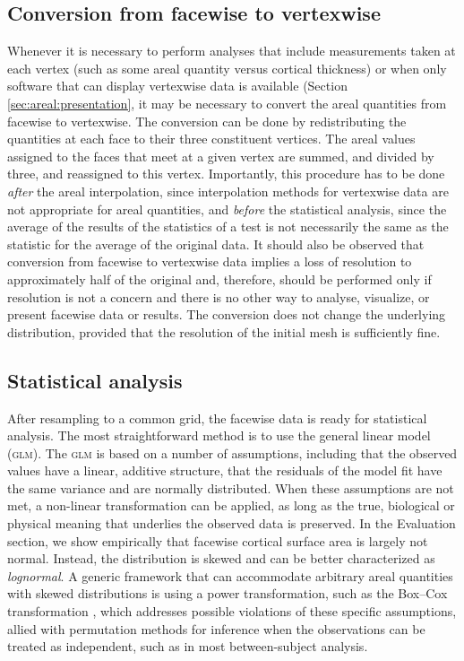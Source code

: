 \subsection{Conversion from facewise to vertexwise}
\label{sec:areal:conversion}

Whenever it is necessary to perform analyses that include measurements taken at each vertex (such as some areal quantity versus cortical thickness) or when only software that can display vertexwise data is available (Section \ref{sec:areal:presentation}, it may be necessary to convert the areal quantities from facewise to vertexwise. The conversion can be done by redistributing the quantities at each face to their three constituent vertices. The areal values assigned to the faces that meet at a given vertex are summed, and divided by three, and reassigned to this vertex. Importantly, this procedure has to be done \emph{after} the areal interpolation, since interpolation methods for vertexwise data are not appropriate for areal quantities, and \emph{before} the statistical analysis, since the average of the results of the statistics of a test is not necessarily the same as the statistic for the average of the original data. It should also be observed that conversion from facewise to vertexwise data implies a loss of resolution to approximately half of the original and, therefore, should be performed only if resolution is not a concern and there is no other way to analyse, visualize, or present facewise data or results. The conversion does not change the underlying distribution, provided that the resolution of the initial mesh is sufficiently fine.

\subsection{Statistical analysis}

After resampling to a common grid, the facewise data is ready for statistical analysis. The most straightforward method is to use the general linear model (\textsc{glm}). The \textsc{glm} is based on a number of assumptions, including that the observed values have a linear, additive structure, that the residuals of the model fit have the same variance and are normally distributed. When these assumptions are not met, a non-linear transformation can be applied, as long as the true, biological or physical meaning that underlies the observed data is preserved. In the Evaluation section, we show empirically that facewise cortical surface area is largely not normal. Instead, the distribution is skewed and can be better characterized as \emph{lognormal}. A generic framework that can accommodate arbitrary areal quantities with skewed distributions is using a power transformation, such as the Box--Cox transformation \citep{Box1964}, which addresses possible violations of these specific assumptions, allied with permutation methods for inference \citep[see also Chapter \ref{sec:perm}]{Holmes1996, Nichols2003} when the observations can be treated as independent, such as in most between-subject analysis.

